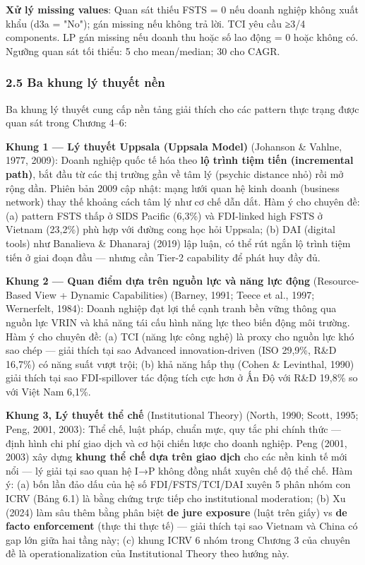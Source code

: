 \documentclass[12pt,a4paper]{article}
\begin{document}
\textbf{Xử lý missing values}: Quan sát thiếu FSTS = 0 nếu doanh nghiệp
không xuất khẩu (d3a = "No"); gán missing nếu không trả lời. TCI yêu cầu
≥3/4 components. LP gán missing nếu doanh thu hoặc số lao động = 0 hoặc
không có. Ngưỡng quan sát tối thiểu: 5 cho mean/median; 30 cho CAGR.

\hypertarget{25-ba-khung-luxfd-thuyux1ebft-nux1ec1n}{%
\subsubsection{2.5 Ba khung lý thuyết
nền}\label{25-ba-khung-luxfd-thuyux1ebft-nux1ec1n}}

Ba khung lý thuyết cung cấp nền tảng giải thích cho các pattern thực
trạng được quan sát trong Chương 4--6:

\textbf{Khung 1 --- Lý thuyết Uppsala (Uppsala Model)} (Johanson \&
Vahlne, 1977, 2009): Doanh nghiệp quốc tế hóa theo \textbf{lộ trình tiệm
tiến (incremental path)}, bắt đầu từ các thị trường gần về tâm lý
(psychic distance nhỏ) rồi mở rộng dần. Phiên bản 2009 cập nhật: mạng
lưới quan hệ kinh doanh (business network) thay thế khoảng cách tâm lý
như cơ chế dẫn dắt. Hàm ý cho chuyên đề: (a) pattern FSTS thấp ở SIDS
Pacific (6,3\%) và FDI-linked high FSTS ở Vietnam (23,2\%) phù hợp với
đường cong học hỏi Uppsala; (b) DAI (digital tools) như Banalieva \&
Dhanaraj (2019) lập luận, có thể rút ngắn lộ trình tiệm tiến ở giai đoạn
đầu --- nhưng cần Tier-2 capability để phát huy đầy đủ.

\textbf{Khung 2 --- Quan điểm dựa trên nguồn lực và năng lực động}
(Resource-Based View + Dynamic Capabilities) (Barney, 1991; Teece et
al., 1997; Wernerfelt, 1984): Doanh nghiệp đạt lợi thế cạnh tranh bền
vững thông qua nguồn lực VRIN và khả năng tái cấu hình năng lực theo
biến động môi trường. Hàm ý cho chuyên đề: (a) TCI (năng lực công nghệ)
là proxy cho nguồn lực khó sao chép --- giải thích tại sao Advanced
innovation-driven (ISO 29,9\%, R\&D 16,7\%) có năng suất vượt trội; (b)
khả năng hấp thụ (Cohen \& Levinthal, 1990) giải thích tại sao
FDI-spillover tác động tích cực hơn ở Ấn Độ với R\&D 19,8\% so với Việt
Nam 6,1\%.

\textbf{Khung 3, Lý thuyết thể chế} (Institutional Theory) (North, 1990;
Scott, 1995; Peng, 2001, 2003): Thể chế, luật pháp, chuẩn mực, quy tắc
phi chính thức --- định hình chi phí giao dịch và cơ hội chiến lược cho
doanh nghiệp. Peng (2001, 2003) xây dựng \textbf{khung thể chế dựa trên
giao dịch} cho các nền kinh tế mới nổi --- lý giải tại sao quan hệ I→P
không đồng nhất xuyên chế độ thể chế. Hàm ý: (a) bốn lần đảo dấu của hệ
số FDI/FSTS/TCI/DAI xuyên 5 phân nhóm con ICRV (Bảng 6.1) là bằng chứng
trực tiếp cho institutional moderation; (b) Xu (2024) làm sâu thêm bằng
phân biệt \textbf{de jure exposure} (luật trên giấy) vs \textbf{de facto
enforcement} (thực thi thực tế) --- giải thích tại sao Vietnam và China
có gap lớn giữa hai tầng này; (c) khung ICRV 6 nhóm trong Chương 3 của
chuyên đề là operationalization của Institutional Theory theo hướng này.
\end{document}
